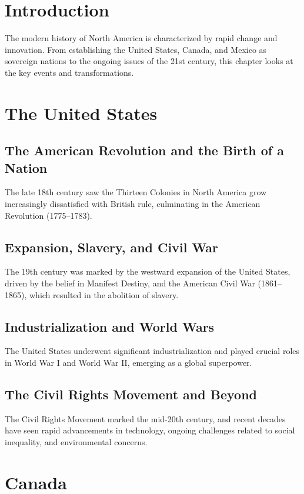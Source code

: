 \documentclass[a4paper,12pt]{book}
\begin{document}
\section{Introduction}
\label{sec:introduction-north-america-modern}
The modern history of North America is characterized by rapid change and innovation. From establishing the United States, Canada, and Mexico as sovereign nations to the ongoing issues of the 21st century, this chapter looks at the key events and transformations.

\section{The United States}
\label{sec:united-states}

\subsection{The American Revolution and the Birth of a Nation}
The late 18th century saw the Thirteen Colonies in North America grow increasingly dissatisfied with British rule, culminating in the American Revolution (1775–1783).

\subsection{Expansion, Slavery, and Civil War}
The 19th century was marked by the westward expansion of the United States, driven by the belief in Manifest Destiny, and the American Civil War (1861–1865), which resulted in the abolition of slavery.

\subsection{Industrialization and World Wars}
The United States underwent significant industrialization and played crucial roles in World War I and World War II, emerging as a global superpower.

\subsection{The Civil Rights Movement and Beyond}
The Civil Rights Movement marked the mid-20th century, and recent decades have seen rapid advancements in technology, ongoing challenges related to social inequality, and environmental concerns.

\section{Canada}
\label{sec:canada}
\end{document}
